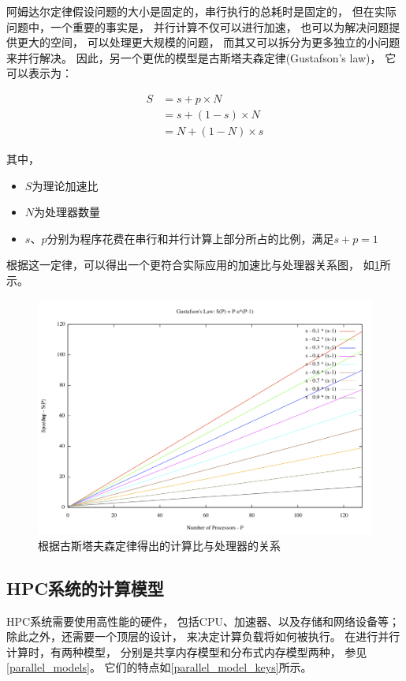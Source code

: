 阿姆达尔定律假设问题的大小是固定的，串行执行的总耗时是固定的，
但在实际问题中，一个重要的事实是，
并行计算不仅可以进行加速，
也可以为解决问题提供更大的空间，
可以处理更大规模的问题，
而其又可以拆分为更多独立的小问题来并行解决\cite{when_amdahls_law_does_not_apply}。
因此，另一个更优的模型是古斯塔夫森定律(Gustafson's law)\cite{wiki_gustafson}，
它可以表示为：

\begin{align}
S &= s + p \times N \\
    &= s + (1 - s) \times N \\
    &= N + (1 - N) \times s
\end{align}

其中，
\begin{itemize}
    \item $S$为理论加速比
    \item $N$为处理器数量
    \item $s$、$p$分别为程序花费在串行和并行计算上部分所占的比例，满足$s+p=1$
\end{itemize}

根据这一定律，可以得出一个更符合实际应用的加速比与处理器关系图，
如\cref{gustafsons_law}所示。

\begin{figure}[ht!]
    \centering
    \includegraphics[width=\linewidth]{images/Gustafson.png}
    \caption{根据古斯塔夫森定律得出的计算比与处理器的关系}
    \label{gustafsons_law}
\end{figure}

\subsection{HPC系统的计算模型}
HPC系统需要使用高性能的硬件，
包括CPU、加速器、以及存储和网络设备等；
除此之外，还需要一个顶层的设计，
来决定计算负载将如何被执行。
在进行并行计算时，有两种模型，
分别是共享内存模型和分布式内存模型两种\cite{intro_cluster_computing}，
参见\cref{parallel_models}。
它们的特点如\cref{parallel_model_keys}所示。

